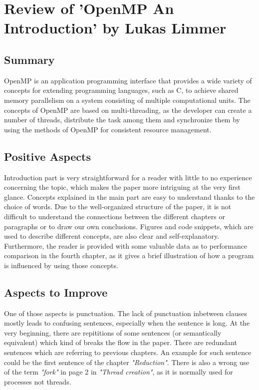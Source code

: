 \documentclass[ieeetran]{article}
\begin{document}
\section*{Review of 'OpenMP An Introduction' by Lukas Limmer} %
\label{sec:review_of_openMP_an_introduction_by_lukas_limmer}

\subsection*{Summary} %
\label{sub:summary}
OpenMP is an application programming interface that provides a wide variety of concepts for extending programming languages, such as C, to achieve shared memory parallelism on a system consisting of multiple computational units. The concepts of OpenMP are based on multi-threading, as the developer can create a number of threads, distribute the task among them and synchronize them by using the methods of OpenMP for consistent resource management.

\subsection*{Positive Aspects} %
\label{sub:positive_aspects}
Introduction part is very straightforward for a reader with little to no experience concerning the topic, which makes the paper more intriguing at the very first glance. Concepts explained in the main part are easy to understand thanks to the choice of words. Due to the well-organized structure of the paper, it is not difficult to understand the connections between the different chapters or paragraphs or to draw our own conclusions. Figures and code snippets, which are used to describe different concepts, are also clear and self-explanatory. Furthermore, the reader is provided with some valuable data as to performance comparison in the fourth chapter, as it gives a brief illustration of how a program is influenced by using those concepts.

\subsection*{Aspects to Improve} %
\label{sub:aspects_to_improve}
One of those aspects is punctuation. The lack of punctuation inbetween clauses mostly leads to confusing sentences, especially when the sentence is long. At the very beginning, there are repititions of some sentences (or semantically equivalent) which kind of breaks the flow in the paper. There are redundant sentences which are referring to previous chapters. An example for such sentence could be the first sentence of the chapter \textit{"Reduction"}. There is also a wrong use of the term \textit{"fork"} in page 2 in \textit{"Thread creation"}, as it is normally used for processes not threads. 
\end{document}
